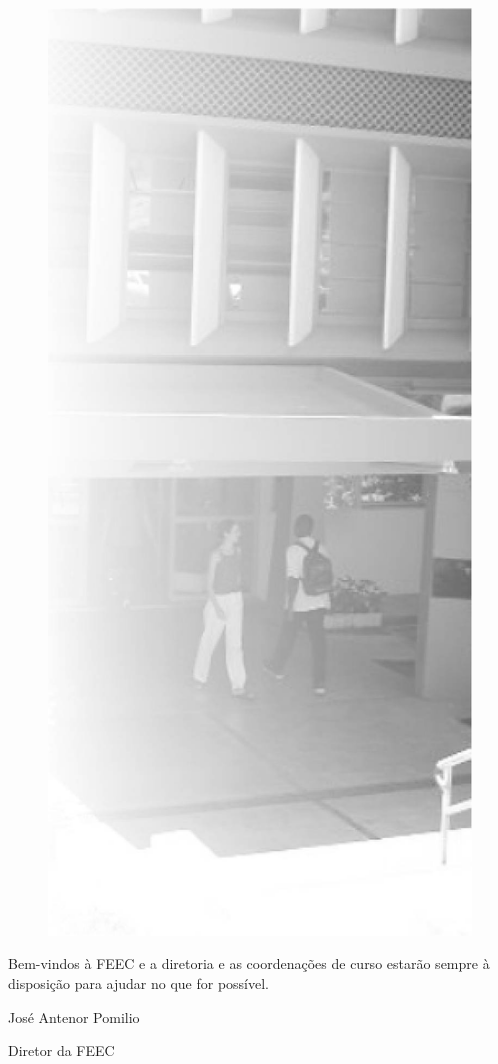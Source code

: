 \begin{figure}
    \includegraphics[scale=0.30, keepaspectratio=true]{img/imgs/3-feec/feec.jpg}
\end{figure}

Bem-vindos à FEEC e a diretoria e as coordenações de curso estarão sempre à
disposição para ajudar no que for possível.

José Antenor Pomilio

Diretor da FEEC
